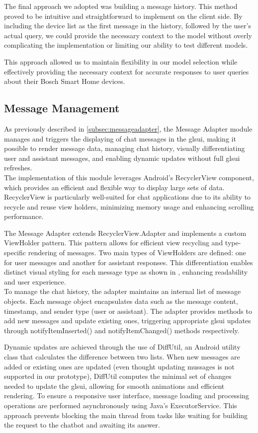The final approach we adopted was building a message history. This method proved to be intuitive and straightforward to implement on the client side. By including the device list as the first message in the history, followed by the user's actual query, we could provide the necessary context to the model without overly complicating the implementation or limiting our ability to test different models.

This approach allowed us to maintain flexibility in our model selection while effectively providing the necessary context for accurate responses to user queries about their Bosch Smart Home devices.


\subsection{Message Management}
As previously described in \cref{subsec:messageadapter}, the Message Adapter module manages and triggers the displaying of chat messages in the gls{ui}, making it possible to render message data, managing chat history, visually differentiating user and assistant messages, and enabling dynamic updates without full gls{ui} refreshes. \\
The implementation of this module leverages Android's RecyclerView component, which provides an efficient and flexible way to display large sets of data. RecyclerView is particularly well-suited for chat applications due to its ability to recycle and reuse view holders, minimizing memory usage and enhancing scrolling performance.


The Message Adapter extends RecyclerView.Adapter and implements a custom ViewHolder pattern. This pattern allows for efficient view recycling and type-specific rendering of messages. Two main types of ViewHolders are defined: one for user messages and another for assistant responses. This differentiation enables distinct visual styling for each message type as shown in , enhancing readability and user experience.\\
To manage the chat history, the adapter maintains an internal list of message objects. Each message object encapsulates data such as the message content, timestamp, and sender type (user or assistant). The adapter provides methods to add new messages and update existing ones, triggering appropriate gls{ui} updates through notifyItemInserted() and notifyItemChanged() methods respectively.

Dynamic updates are achieved through the use of DiffUtil, an Android utility class that calculates the difference between two lists. When new messages are added or existing ones are updated (even thought updating mussages is not supported in our prototype), DiffUtil computes the minimal set of changes needed to update the gls{ui}, allowing for smooth animations and efficient rendering.
To ensure a responsive user interface, message loading and processing operations are performed asynchronously using Java's ExecutorService. This approach prevents blocking the main thread from tasks like waiting for building the request to the chatbot and awaiting its answer.



